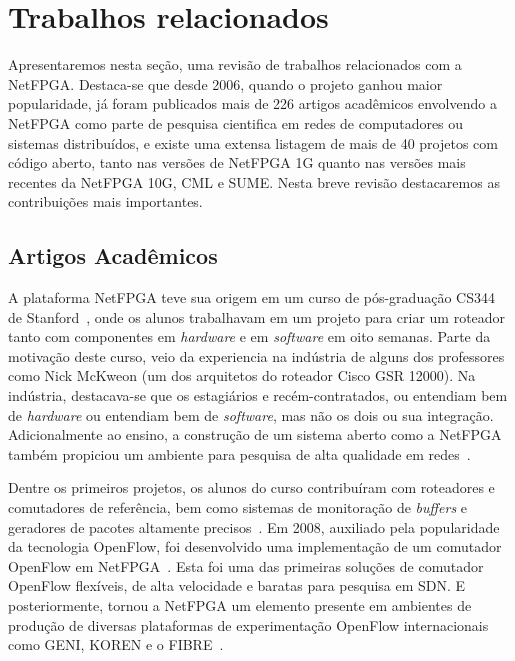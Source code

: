 \newpage
\section{Trabalhos relacionados}
\label{sec:related}

Apresentaremos nesta seção, uma revisão de trabalhos relacionados
com a NetFPGA. Destaca-se que desde 2006, quando o projeto ganhou
maior popularidade, já foram publicados mais de 226 artigos
acadêmicos envolvendo a NetFPGA como parte de pesquisa cientifica em
redes de computadores ou sistemas distribuídos, e existe uma extensa
listagem de mais de 40 projetos com código aberto, tanto nas versões
de NetFPGA 1G quanto nas versões mais recentes da NetFPGA 10G, CML e
SUME. Nesta breve revisão destacaremos as contribuições mais
importantes.

\subsection{Artigos Acadêmicos}

A plataforma NetFPGA teve sua origem em um curso de pós-graduação
CS344 de Stanford~\cite{4589059}, onde os alunos trabalhavam em um
projeto para criar um roteador tanto com componentes em
\textit{hardware} e em \textit{software} em oito semanas. Parte da
motivação deste curso, veio da experiencia na indústria de alguns
dos professores como Nick McKweon (um dos arquitetos do roteador
Cisco GSR 12000). Na indústria, destacava-se que os estagiários e
recém-contratados, ou entendiam bem de \textit{hardware} ou
entendiam bem de \textit{software}, mas não os dois ou sua
integração. Adicionalmente ao ensino, a construção de um sistema
aberto como a NetFPGA também propiciou um ambiente para pesquisa de
alta qualidade em redes~\cite{Naous:2008:NRR:1397718.1397720}.

Dentre os primeiros projetos, os alunos do curso contribuíram com
roteadores e comutadores de referência, bem como sistemas de
monitoração de \emph{buffers} e geradores de pacotes altamente
precisos~\cite{5290917}. Em 2008, auxiliado pela popularidade da
tecnologia OpenFlow, foi desenvolvido uma implementação de um
comutador OpenFlow em NetFPGA~\cite{Naous:2008:IOS:1477942.1477944}.
Esta foi uma das primeiras soluções de comutador OpenFlow flexíveis,
de alta velocidade e baratas para pesquisa em SDN. E posteriormente,
tornou a NetFPGA um elemento presente em ambientes de produção de
diversas plataformas de experimentação OpenFlow internacionais como
GENI, KOREN e o FIBRE~\cite{1649119}.

